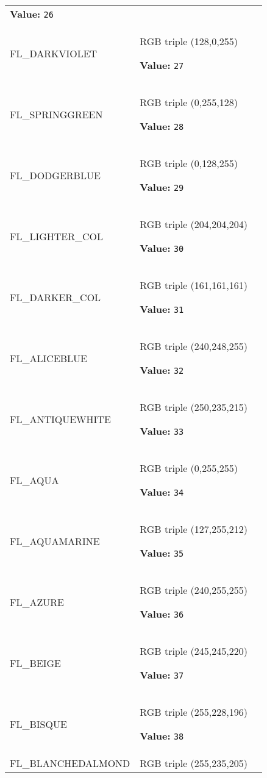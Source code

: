 \begin{longtable}{|p{\varnamewidth}|p{\vardescrwidth}|l}
\textbf{Value:} 
{\tt 26}&\\
\cline{1-2}
\raggedright F\-L\-\_\-D\-A\-R\-K\-V\-I\-O\-L\-E\-T\- & \raggedright RGB triple (128,0,255)

\textbf{Value:} 
{\tt 27}&\\
\cline{1-2}
\raggedright F\-L\-\_\-S\-P\-R\-I\-N\-G\-G\-R\-E\-E\-N\- & \raggedright RGB triple (0,255,128)

\textbf{Value:} 
{\tt 28}&\\
\cline{1-2}
\raggedright F\-L\-\_\-D\-O\-D\-G\-E\-R\-B\-L\-U\-E\- & \raggedright RGB triple (0,128,255)

\textbf{Value:} 
{\tt 29}&\\
\cline{1-2}
\raggedright F\-L\-\_\-L\-I\-G\-H\-T\-E\-R\-\_\-C\-O\-L\-1\- & \raggedright RGB triple (204,204,204)

\textbf{Value:} 
{\tt 30}&\\
\cline{1-2}
\raggedright F\-L\-\_\-D\-A\-R\-K\-E\-R\-\_\-C\-O\-L\-1\- & \raggedright RGB triple (161,161,161)

\textbf{Value:} 
{\tt 31}&\\
\cline{1-2}
\raggedright F\-L\-\_\-A\-L\-I\-C\-E\-B\-L\-U\-E\- & \raggedright RGB triple (240,248,255)

\textbf{Value:} 
{\tt 32}&\\
\cline{1-2}
\raggedright F\-L\-\_\-A\-N\-T\-I\-Q\-U\-E\-W\-H\-I\-T\-E\- & \raggedright RGB triple (250,235,215)

\textbf{Value:} 
{\tt 33}&\\
\cline{1-2}
\raggedright F\-L\-\_\-A\-Q\-U\-A\- & \raggedright RGB triple (0,255,255)

\textbf{Value:} 
{\tt 34}&\\
\cline{1-2}
\raggedright F\-L\-\_\-A\-Q\-U\-A\-M\-A\-R\-I\-N\-E\- & \raggedright RGB triple (127,255,212)

\textbf{Value:} 
{\tt 35}&\\
\cline{1-2}
\raggedright F\-L\-\_\-A\-Z\-U\-R\-E\- & \raggedright RGB triple (240,255,255)

\textbf{Value:} 
{\tt 36}&\\
\cline{1-2}
\raggedright F\-L\-\_\-B\-E\-I\-G\-E\- & \raggedright RGB triple (245,245,220)

\textbf{Value:} 
{\tt 37}&\\
\cline{1-2}
\raggedright F\-L\-\_\-B\-I\-S\-Q\-U\-E\- & \raggedright RGB triple (255,228,196)

\textbf{Value:} 
{\tt 38}&\\
\cline{1-2}
\raggedright F\-L\-\_\-B\-L\-A\-N\-C\-H\-E\-D\-A\-L\-M\-O\-N\-D\- & \raggedright RGB triple (255,235,205)


\end{longtable}
